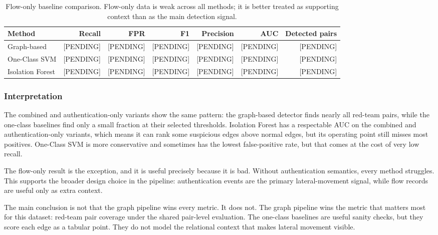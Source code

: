 \begin{table}[h]
\centering
\small
\begin{tabular}{lrrrrrr}
\hline
Method & Recall & FPR & F1 & Precision & AUC & Detected pairs \\
\hline
Graph-based      & [PENDING] & [PENDING] & [PENDING] & [PENDING] & [PENDING] & [PENDING] \\
One-Class SVM    & [PENDING] & [PENDING] & [PENDING] & [PENDING] & [PENDING] & [PENDING] \\
Isolation Forest & [PENDING] & [PENDING] & [PENDING] & [PENDING] & [PENDING] & [PENDING] \\
\hline
\end{tabular}
\caption{Flow-only baseline comparison. Flow-only data is weak across all methods; it is better treated as supporting context than as the main detection signal.}
\label{tab:baseline_flow}
\end{table}

\subsubsection{Interpretation}

The combined and authentication-only variants show the same pattern: the graph-based detector finds nearly all red-team pairs, while the one-class baselines find only a small fraction at their selected thresholds. Isolation Forest has a respectable AUC on the combined and authentication-only variants, which means it can rank some suspicious edges above normal edges, but its operating point still misses most positives. One-Class SVM is more conservative and sometimes has the lowest false-positive rate, but that comes at the cost of very low recall.

The flow-only result is the exception, and it is useful precisely because it is bad. Without authentication semantics, every method struggles. This supports the broader design choice in the pipeline: authentication events are the primary lateral-movement signal, while flow records are useful only as extra context.

The main conclusion is not that the graph pipeline wins every metric. It does not. The graph pipeline wins the metric that matters most for this dataset: red-team pair coverage under the shared pair-level evaluation. The one-class baselines are useful sanity checks, but they score each edge as a tabular point. They do not model the relational context that makes lateral movement visible.

